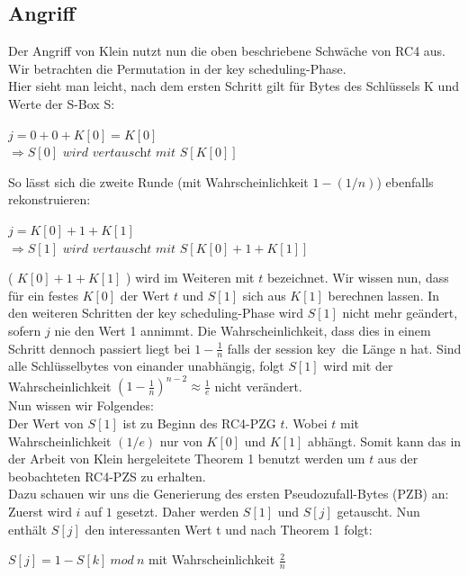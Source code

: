 \documentclass[10pt,a4paper]{article}
\begin{document}
\subsection{Angriff}\label{ssec:klein}
Der Angriff von Klein nutzt nun die oben beschriebene Schwäche von RC4 aus. Wir betrachten die Permutation in der \glqq key scheduling\grqq -Phase.\\
Hier sieht man leicht, nach dem ersten Schritt gilt für Bytes des Schlüssels K und Werte der S-Box S:
\begin{center}
$ j = 0+0+K[0] = K[0] $
\\\vspace{0.5em}
$\Rightarrow S[0] \textit{ wird vertauscht mit }  S[K[0]] $\\
\end{center}
So lässt sich die zweite Runde (mit Wahrscheinlichkeit $1 - (1/n)$) ebenfalls rekonstruieren:
\begin{center}
$ j = K[0] + 1 + K[1]$
\\\vspace{0.5em}
$\Rightarrow S[1] \textit{ wird vertauscht mit } S[ K[0] + 1 + K[1] ] $
\end{center}
( $K[0] + 1 + K[1]$ ) wird im Weiteren mit  $t$ bezeichnet. Wir wissen nun, dass für ein festes $K[0]$ der Wert $t$ und $S[1]$ sich aus $K[1]$ berechnen lassen. In den weiteren Schritten der \glqq key scheduling\grqq -Phase wird $S[1]$ nicht mehr geändert, sofern $j$ nie den Wert 1 annimmt.
Die Wahrscheinlichkeit, dass dies in einem Schritt dennoch passiert liegt bei $1 - \frac{1}{n}$ falls der \glqq session key\grqq\ die Länge n hat.
Sind alle Schlüsselbytes von einander unabhängig, folgt $S[1]$ wird mit der Wahrscheinlichkeit $(1-\frac{1}{n})^{n-2} \approx \frac{1}{e}$ nicht verändert.\\
Nun wissen wir Folgendes:\\
Der Wert von $S[1]$ ist zu Beginn des RC4-PZG $t$. Wobei $t$ mit Wahrscheinlichkeit $(1/e)$ nur von $K[0]$ und $K[1]$ abhängt. Somit kann das in der Arbeit von Klein hergeleitete Theorem 1 \cite{Kle08} benutzt werden um $t$ aus der beobachteten RC4-PZS zu erhalten.\\
Dazu schauen wir uns die Generierung des ersten Pseudozufall-Bytes (PZB) an:\\
Zuerst wird $i$ auf $1$ gesetzt. Daher werden $S[1]$ und $S[j]$ getauscht. Nun enthält $S[j]$ den interessanten Wert t und nach Theorem 1 folgt: 
\begin{center}
$S[j] = 1 - S[k]\ mod\ n$ mit Wahrscheinlichkeit $\frac{2}{n}$
\end{center}
\end{document}
